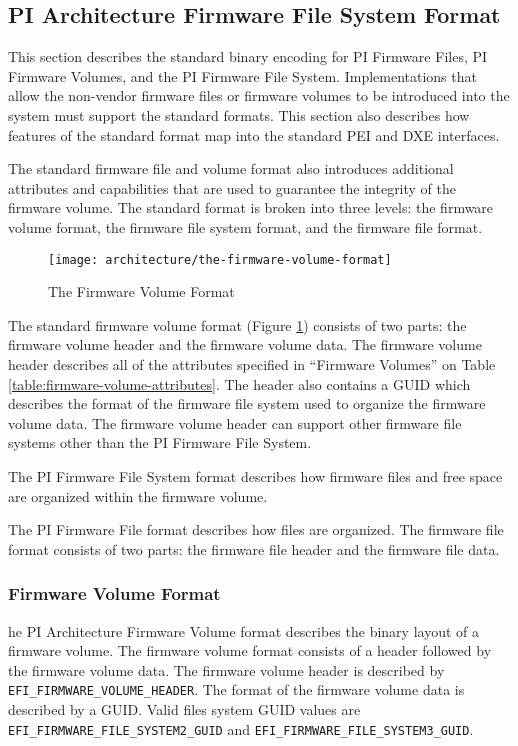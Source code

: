 \subsection{PI Architecture Firmware File System Format}
This section describes the standard binary encoding for PI Firmware Files, PI Firmware Volumes, and the PI Firmware File System. Implementations that allow the non-vendor firmware files or firmware volumes to be introduced into the system must support the standard formats. This section also describes how features of the standard format map into the standard PEI and DXE interfaces.

The standard firmware file and volume format also introduces additional attributes and capabilities that are used to guarantee the integrity of the firmware volume. The standard format is broken into three levels: the firmware volume format, the firmware file system format, and the firmware file format.

\begin{figure}[!htbp]
	\centering
	\texttt{[image: architecture/the-firmware-volume-format]}
	\caption{The Firmware Volume Format}\label{fig:architecture-the-firmware-volume-format}
\end{figure}

The standard firmware volume format (Figure \ref{fig:architecture-the-firmware-volume-format}) consists of two parts: the firmware volume header and the firmware volume data. The firmware volume header describes all of the attributes specified in “Firmware Volumes” on Table \ref{table:firmware-volume-attributes}. The header also contains a GUID which describes the format of the firmware file system used to organize the firmware volume data. The firmware volume header can support other firmware file systems other than the PI Firmware File System.

The PI Firmware File System format describes how firmware files and free space are organized
within the firmware volume.

The PI Firmware File format describes how files are organized. The firmware file format consists of
two parts: the firmware file header and the firmware file data.

\subsubsection{Firmware Volume Format}
he PI Architecture Firmware Volume format describes the binary layout of a firmware volume.
The firmware volume format consists of a header followed by the firmware volume data. The
firmware volume header is described by \verb|EFI_FIRMWARE_VOLUME_HEADER|.
The format of the firmware volume data is described by a GUID. Valid files system GUID values
are \verb|EFI_FIRMWARE_FILE_SYSTEM2_GUID| and \verb|EFI_FIRMWARE_FILE_SYSTEM3_GUID|.

